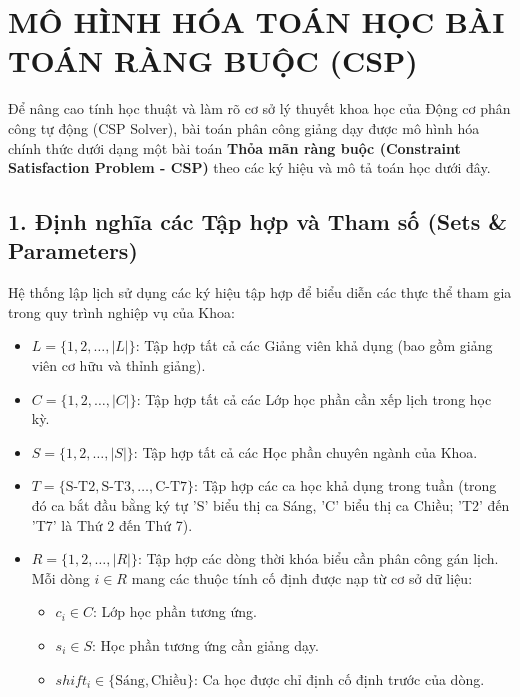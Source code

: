 \documentclass{article}
\begin{document}
\section*{MÔ HÌNH HÓA TOÁN HỌC BÀI TOÁN RÀNG BUỘC (CSP)}

Để nâng cao tính học thuật và làm rõ cơ sở lý thuyết khoa học của Động cơ phân công tự động (CSP Solver), bài toán phân công giảng dạy được mô hình hóa chính thức dưới dạng một bài toán \textbf{Thỏa mãn ràng buộc (Constraint Satisfaction Problem - CSP)} theo các ký hiệu và mô tả toán học dưới đây.

\subsection*{1. Định nghĩa các Tập hợp và Tham số (Sets \& Parameters)}

Hệ thống lập lịch sử dụng các ký hiệu tập hợp để biểu diễn các thực thể tham gia trong quy trình nghiệp vụ của Khoa:
\begin{itemize}
    \item $L = \{1, 2, \dots, |L|\}$: Tập hợp tất cả các Giảng viên khả dụng (bao gồm giảng viên cơ hữu và thỉnh giảng).
    \item $C = \{1, 2, \dots, |C|\}$: Tập hợp tất cả các Lớp học phần cần xếp lịch trong học kỳ.
    \item $S = \{1, 2, \dots, |S|\}$: Tập hợp tất cả các Học phần chuyên ngành của Khoa.
    \item $T = \{\text{S-T2}, \text{S-T3}, \dots, \text{C-T7}\}$: Tập hợp các ca học khả dụng trong tuần (trong đó ca bắt đầu bằng ký tự 'S' biểu thị ca Sáng, 'C' biểu thị ca Chiều; 'T2' đến 'T7' là Thứ 2 đến Thứ 7).
    \item $R = \{1, 2, \dots, |R|\}$: Tập hợp các dòng thời khóa biểu cần phân công gán lịch. Mỗi dòng $i \in R$ mang các thuộc tính cố định được nạp từ cơ sở dữ liệu:
    \begin{itemize}
        \item $c_i \in C$: Lớp học phần tương ứng.
        \item $s_i \in S$: Học phần tương ứng cần giảng dạy.
        \item $shift_i \in \{\text{Sáng}, \text{Chiều}\}$: Ca học được chỉ định cố định trước của dòng.
    \end{itemize}
\end{itemize}
\end{document}
